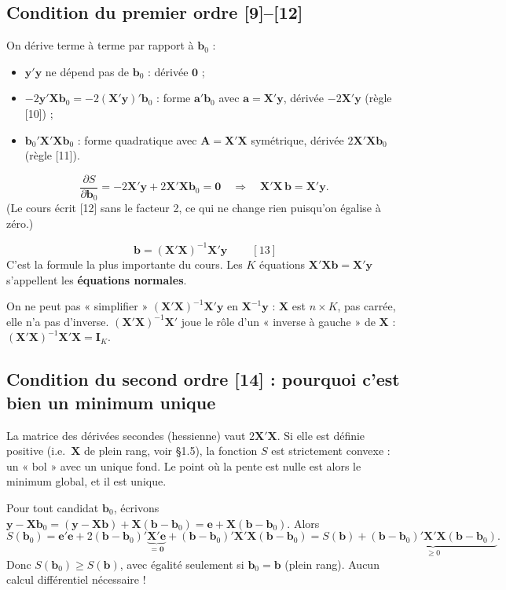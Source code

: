 \documentclass[11pt,a4paper]{article}
\newcommand{\vy}{\mathbf{y}}
\newcommand{\vX}{\mathbf{X}}
\newcommand{\ve}{\mathbf{e}}
\newcommand{\vb}{\mathbf{b}}
\newcommand{\I}{\mathbf{I}}
\newcommand{\A}{\mathbf{A}}
\newcommand{\XtX}{\vX'\vX}
\newcommand{\XtXi}{(\vX'\vX)^{-1}}
\begin{document}
\subsection{Condition du premier ordre [9]--[12]}
On dérive terme à terme par rapport à $\vb_0$ :
\begin{itemize}[nosep]
\item $\vy'\vy$ ne dépend pas de $\vb_0$ : dérivée $\mathbf 0$ ;
\item $-2\vy'\vX\vb_0=-2(\vX'\vy)'\vb_0$ : forme $\mathbf a'\vb_0$ avec $\mathbf a=\vX'\vy$, dérivée $-2\vX'\vy$ (règle [10]) ;
\item $\vb_0'\XtX\vb_0$ : forme quadratique avec $\A=\XtX$ symétrique, dérivée $2\XtX\vb_0$ (règle [11]).
\end{itemize}
\[
\frac{\partial S}{\partial\vb_0}=-2\vX'\vy+2\XtX\vb_0=\mathbf 0
\quad\Longrightarrow\quad \XtX\,\vb=\vX'\vy .
\]
(Le cours écrit [12] sans le facteur 2, ce qui ne change rien puisqu'on égalise à zéro.)

\begin{resultat}
\[
\boxed{\ \vb=\XtXi\vX'\vy\ } \qquad [13]
\]
C'est la formule la plus importante du cours. Les $K$ équations $\XtX\vb=\vX'\vy$ s'appellent les \textbf{équations normales}.
\end{resultat}

\begin{attention}
On ne peut pas « simplifier » $\XtXi\vX'\vy$ en $\vX^{-1}\vy$ : $\vX$ est $n\times K$, pas carrée, elle n'a pas d'inverse. $\XtXi\vX'$ joue le rôle d'un « inverse à gauche » de $\vX$ : $\XtXi\vX'\vX=\I_K$.
\end{attention}

\subsection{Condition du second ordre [14] : pourquoi c'est bien un minimum unique}
La matrice des dérivées secondes (hessienne) vaut $2\XtX$. Si elle est définie positive (i.e.\ $\vX$ de plein rang, voir §1.5), la fonction $S$ est strictement convexe : un « bol » avec un unique fond. Le point où la pente est nulle est alors le minimum global, et il est unique.

\begin{detail}[title={Preuve directe (sans dérivée) que $\vb$ est le minimum}]
Pour tout candidat $\vb_0$, écrivons $\vy-\vX\vb_0=(\vy-\vX\vb)+\vX(\vb-\vb_0)=\ve+\vX(\vb-\vb_0)$. Alors
\[
S(\vb_0)=\ve'\ve+2(\vb-\vb_0)'\underbrace{\vX'\ve}_{=\mathbf 0}+(\vb-\vb_0)'\XtX(\vb-\vb_0)=S(\vb)+\underbrace{(\vb-\vb_0)'\XtX(\vb-\vb_0)}_{\ge 0}.
\]
Donc $S(\vb_0)\ge S(\vb)$, avec égalité seulement si $\vb_0=\vb$ (plein rang). Aucun calcul différentiel nécessaire !
\end{detail}
\end{document}
